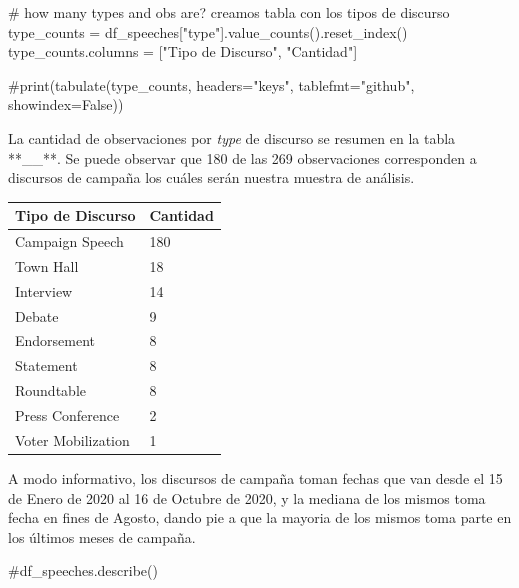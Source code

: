 \documentclass[
  letterpaper,
  DIV=11,
  numbers=noendperiod]{scrartcl}
\newenvironment{Shaded}{\begin{snugshade}}{\end{snugshade}}
\newcommand{\CommentTok}[1]{\textcolor[rgb]{0.37,0.37,0.37}{#1}}
\newcommand{\NormalTok}[1]{\textcolor[rgb]{0.00,0.23,0.31}{#1}}
\newcommand{\OperatorTok}[1]{\textcolor[rgb]{0.37,0.37,0.37}{#1}}
\newcommand{\StringTok}[1]{\textcolor[rgb]{0.13,0.47,0.30}{#1}}
\begin{document}
\begin{Shaded}
\begin{Highlighting}[]
\CommentTok{\# how many types and obs are? creamos tabla con los tipos de discurso}
\NormalTok{type\_counts }\OperatorTok{=}\NormalTok{ df\_speeches[}\StringTok{"type"}\NormalTok{].value\_counts().reset\_index()}
\NormalTok{type\_counts.columns }\OperatorTok{=}\NormalTok{ [}\StringTok{"Tipo de Discurso"}\NormalTok{, }\StringTok{"Cantidad"}\NormalTok{]}

\CommentTok{\#print(tabulate(type\_counts, headers="keys", tablefmt="github", showindex=False))}
\end{Highlighting}
\end{Shaded}

La cantidad de observaciones por \emph{type} de discurso se resumen en
la tabla **\_\_**. Se puede observar que 180 de las 269 observaciones
corresponden a discursos de campaña los cuáles serán nuestra muestra de
análisis.

\begin{longtable}[]{@{}ll@{}}
\toprule\noalign{}
Tipo de Discurso & Cantidad \\
\midrule\noalign{}
\endhead
\bottomrule\noalign{}
\endlastfoot
Campaign Speech & 180 \\
Town Hall & 18 \\
Interview & 14 \\
Debate & 9 \\
Endorsement & 8 \\
Statement & 8 \\
Roundtable & 8 \\
Press Conference & 2 \\
Voter Mobilization & 1 \\
\end{longtable}

A modo informativo, los discursos de campaña toman fechas que van desde
el 15 de Enero de 2020 al 16 de Octubre de 2020, y la mediana de los
mismos toma fecha en fines de Agosto, dando pie a que la mayoria de los
mismos toma parte en los últimos meses de campaña.

\begin{Shaded}
\begin{Highlighting}[]
\CommentTok{\#df\_speeches.describe()}
\end{Highlighting}
\end{Shaded}
\end{document}
